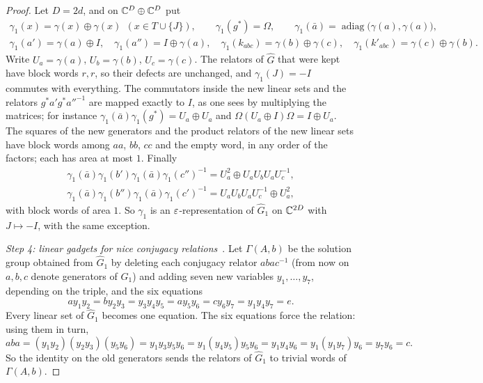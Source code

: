 \begin{proof}
Let $D=2d$, and on $\mathbb C^D\oplus\mathbb C^D$ put
\begin{gather*}
\gamma_1(x)=\gamma(x)\oplus\gamma(x)\ \ (x\in T\cup\{J\}),\qquad\gamma_1(g^*)=\Omega,\qquad\gamma_1(\bar a)=\operatorname{adiag}\bigl(\gamma(a),\gamma(a)\bigr),\\
\gamma_1(a')=\gamma(a)\oplus I,\quad\gamma_1(a'')=I\oplus\gamma(a),\quad\gamma_1(k_{abc})=\gamma(b)\oplus\gamma(c),\quad\gamma_1(k'_{abc})=\gamma(c)\oplus\gamma(b).
\end{gather*}
Write $U_a=\gamma(a)$, $U_b=\gamma(b)$, $U_c=\gamma(c)$. The relators of $\widehat G$ that were kept have block words $r,r$, so their defects
are unchanged, and $\gamma_1(J)=-I$ commutes with everything. The commutators inside the new linear sets and the relators $g^*a'g^*a''^{-1}$
are mapped exactly to $I$, as one sees by multiplying the matrices; for instance $\gamma_1(\bar a)\gamma_1(g^*)=U_a\oplus U_a$ and
$\Omega(U_a\oplus I)\Omega=I\oplus U_a$. The squares of the new generators and the product relators of the new linear sets have block words
among $aa$, $bb$, $cc$ and the empty word, in any order of the factors; each has area at most $1$. Finally
\begin{gather*}
\gamma_1(\bar a)\gamma_1(b')\gamma_1(\bar a)\gamma_1(c'')^{-1}=U_a^2\oplus U_aU_bU_aU_c^{-1},\\
\gamma_1(\bar a)\gamma_1(b'')\gamma_1(\bar a)\gamma_1(c')^{-1}=U_aU_bU_aU_c^{-1}\oplus U_a^2,
\end{gather*}
with block words of area $1$. So $\gamma_1$ is an $\varepsilon$-representation of $\widehat G_1$ on $\mathbb C^{2D}$ with $J\mapsto-I$, with the same
exception.

\emph{Step 4: linear gadgets for nice conjugacy relations}~\cite[Prop.~4.2]{Slo19}. Let $\Gamma(A,b)$ be the solution group obtained from
$\widehat G_1$ by deleting each conjugacy relator $abac^{-1}$ (from now on $a,b,c$ denote generators of $\widehat G_1$) and adding seven new
variables $y_1,\dots,y_7$, depending on the triple, and the six equations
\begin{equation}\label{gadget:six}
ay_1y_2=by_2y_3=y_3y_4y_5=ay_5y_6=cy_6y_7=y_1y_4y_7=e .
\end{equation}
Every linear set of $\widehat G_1$ becomes one equation. The six equations force the relation: using them in turn,
\[
aba=(y_1y_2)(y_2y_3)(y_5y_6)=y_1y_3y_5y_6=y_1(y_4y_5)y_5y_6=y_1y_4y_6=y_1(y_1y_7)y_6=y_7y_6=c .
\]
So the identity on the old generators sends the relators of $\widehat G_1$ to trivial words of $\Gamma(A,b)$.


\end{proof}

